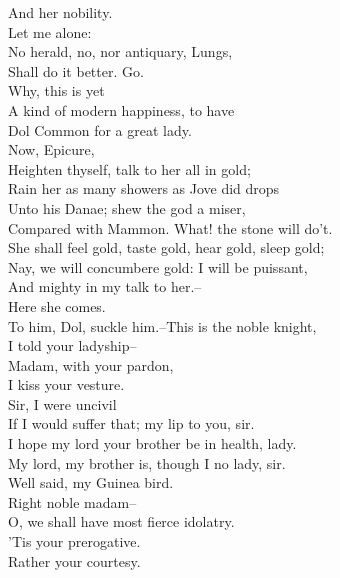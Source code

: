 \documentclass{memoir}
\begin{document}
\begin{drama*}
 And her nobility.\\
\mammonspeaks {} Let me alone:\\
 No herald, no, nor antiquary, Lungs,\\
 Shall do it better. Go.\\
\facespeaks {} Why, this is yet\\
 A kind of modern happiness, to have\\
 Dol Common for a great lady.\\
\mammonspeaks {} Now, Epicure,\\
 Heighten thyself, talk to her all in gold;\\
 Rain her as many showers as Jove did drops\\
 Unto his Danae; shew the god a miser,\\
 Compared with Mammon. What! the stone will do't.\\
 She shall feel gold, taste gold, hear gold, sleep gold;\\
 Nay, we will concumbere gold: I will be puissant,\\
 And mighty in my talk to her.--\\
 Here she comes.\\
\facespeaks {} To him, Dol, suckle him.--This is the noble knight,\\
 I told your ladyship--\\
\mammonspeaks {} Madam, with your pardon,\\
 I kiss your vesture.\\
\dolspeaks {} Sir, I were uncivil\\
 If I would suffer that; my lip to you, sir.\\
\mammonspeaks  I hope my lord your brother be in health, lady.\\
\dolspeaks  My lord, my brother is, though I no lady, sir.\\
\facespeaks {} Well said, my Guinea bird.\\
\mammonspeaks  Right noble madam--\\
\facespeaks {} O, we shall have most fierce idolatry.\\
\mammonspeaks {} 'Tis your prerogative.\\
\dolspeaks  Rather your courtesy.\\

\end{drama*}
\end{document}
